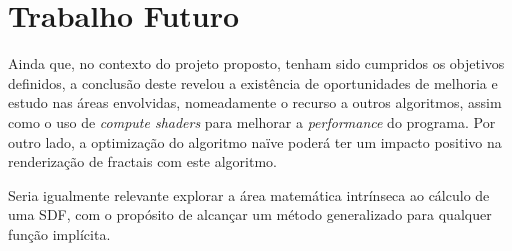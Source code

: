 \section{Trabalho Futuro}
\label{sec::conc:futuro}

Ainda que, no contexto do projeto proposto, tenham sido cumpridos os objetivos definidos, a conclusão deste revelou a existência de oportunidades de melhoria e estudo nas áreas envolvidas, nomeadamente o recurso a outros algoritmos, assim como o uso de \textit{compute shaders} para melhorar a \textit{performance} do programa. Por outro lado, a optimização do algoritmo naïve poderá ter um impacto positivo na renderização de fractais com este algoritmo.

Seria igualmente relevante explorar a área matemática intrínseca ao cálculo de uma \ac{SDF}, com o propósito de alcançar um método generalizado para qualquer função implícita.
